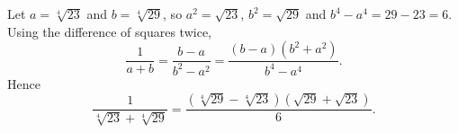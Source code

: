Let $a=\sqrt[4]{23}$ and $b=\sqrt[4]{29}$, so $a^2=\sqrt{23}$, $b^2=\sqrt{29}$ and $b^4-a^4=29-23=6$. Using the difference of squares twice,
\[\dfrac{1}{a+b}=\dfrac{b-a}{b^2-a^2}=\dfrac{(b-a)(b^2+a^2)}{b^4-a^4}.\]
Hence
\[\dfrac{1}{\sqrt[4]{23}+\sqrt[4]{29}}=\boxed{\dfrac{\left(\sqrt[4]{29}-\sqrt[4]{23}\right)\left(\sqrt{29}+\sqrt{23}\right)}{6}}.\]
